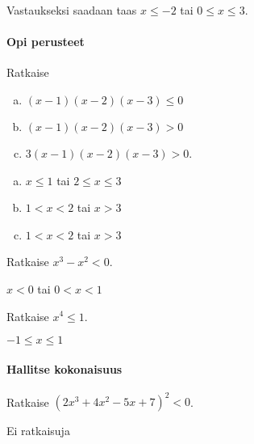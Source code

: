 Vastaukseksi saadaan taas $x\leq -2$ tai $0\leq x \leq 3$.

\begin{tehtavasivu}

\paragraph*{Opi perusteet}

\begin{tehtava}
    Ratkaise
    \begin{enumerate}[a)]
        \item $(x-1)(x-2)(x-3) \le 0$
        \item $(x-1)(x-2)(x-3) > 0$
        \item $3(x-1)(x-2)(x-3) > 0$.
    \end{enumerate}
    \begin{vastaus}
        \begin{enumerate}[a)]
            \item $x \le 1$ tai $2 \le x \le 3$
            \item $1 < x < 2$ tai $x>3$
            \item $1 < x < 2$ tai $x>3$
        \end{enumerate}
    \end{vastaus}
\end{tehtava}

\begin{tehtava}
    Ratkaise $x^3-x^2<0$.
    \begin{vastaus}
    $x<0$ tai $0<x<1$
    \end{vastaus}
\end{tehtava}

\begin{tehtava}
    Ratkaise $x^4 \le 1$.
    \begin{vastaus}
       $-1 \le x \le 1$
    \end{vastaus}
\end{tehtava}


\paragraph*{Hallitse kokonaisuus}

\begin{tehtava}
    Ratkaise $(2x^3+4x^2-5x+7)^2 < 0$.
    \begin{vastaus}
       Ei ratkaisuja
    \end{vastaus}
\end{tehtava}




\end{tehtavasivu}
